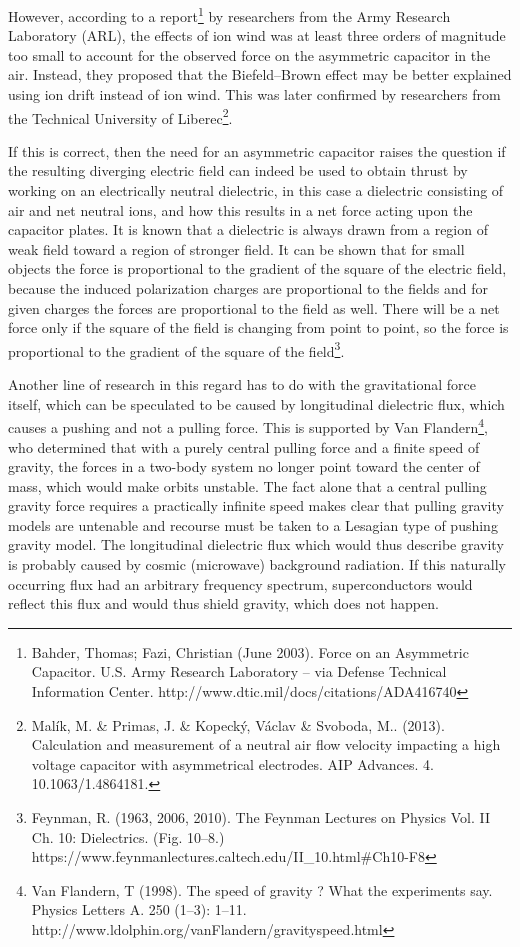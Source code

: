 \documentclass{article}
\begin{document}
However, according to a report\footnote{ Bahder, Thomas; Fazi, Christian (June 2003). Force on an Asymmetric Capacitor.
U.S. Army Research Laboratory -- via Defense Technical Information Center. http://www.dtic.mil/docs/citations/ADA416740
 \par } by researchers from the Army Research Laboratory (ARL), the effects of ion wind was at least three orders of
magnitude too small to account for the observed force on the asymmetric capacitor in the air. Instead, they proposed
that the Biefeld--Brown effect may be better explained using ion drift instead of ion wind. This was later confirmed by
researchers from the Technical University of Liberec\footnote{ Mal\'ik, M. \& Primas, J. \& Kopeck\'y, V\'aclav \&
Svoboda, M.. (2013). Calculation and measurement of a neutral air flow velocity impacting a high voltage capacitor with
asymmetrical electrodes. AIP Advances. 4. 10.1063/1.4864181. \par }. 

If this is correct, then the need for an asymmetric capacitor raises the question if the resulting diverging electric
field can indeed be used to obtain thrust by working on an electrically neutral dielectric, in this case a dielectric
consisting of air and net neutral ions, and how this results in a net force acting upon the capacitor plates. It is
known that a dielectric is always drawn from a region of weak field toward a region of stronger field. It can be shown
that for small objects the force is proportional to the gradient of the square of the electric field, because the
induced polarization charges are proportional to the fields and for given charges the forces are proportional to the
field as well. There will be a net force only if the square of the field is changing from point to point, so the force
is proportional to the gradient of the square of the field\footnote{ Feynman, R. (1963, 2006, 2010). The Feynman
Lectures on Physics Vol. II Ch. 10: Dielectrics. (Fig. 10--8.)
https://www.feynmanlectures.caltech.edu/II\_10.html\#Ch10-F8  \par }.

Another line of research in this regard has to do with the gravitational force itself, which can be speculated to be
caused by longitudinal dielectric flux, which causes a pushing and not a pulling force. This is supported by Van
Flandern\footnote{ Van Flandern, T (1998). The speed of gravity ? What the experiments say. Physics Letters A. 250
(1--3): 1--11. http://www.ldolphin.org/vanFlandern/gravityspeed.html \par }, who determined that with a purely central
pulling force and a finite speed of gravity, the forces in a two-body system no longer point toward the center of mass,
which would make orbits unstable. The fact alone that a central pulling gravity force requires a practically infinite
speed makes clear that pulling gravity models are untenable and recourse must be taken to a Lesagian type of pushing
gravity model. The longitudinal dielectric flux which would thus describe gravity is probably caused by cosmic
(microwave) background radiation. If this naturally occurring flux had an arbitrary frequency spectrum, superconductors
would reflect this flux and would thus shield gravity, which does not happen.
\end{document}
